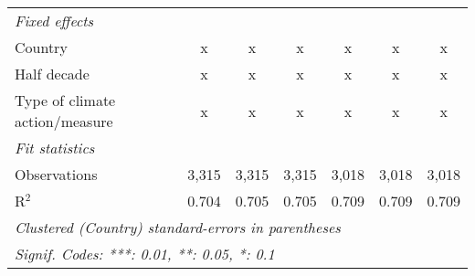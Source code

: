 \begin{tabular}{lcccccc}
   \emph{Fixed effects}\\
   Country                                                          & x       & x             & x             & x             & x             & x\\  
   Half decade                                                      & x       & x             & x             & x             & x             & x\\  
   Type of climate action/measure                                   & x       & x             & x             & x             & x             & x\\  
   \midrule \emph{Fit statistics}\\
   Observations                                                     & 3,315   & 3,315         & 3,315         & 3,018         & 3,018         & 3,018\\  
   R$^2$                                                            & 0.704   & 0.705         & 0.705         & 0.709         & 0.709         & 0.709\\  
   \midrule
   \multicolumn{7}{l}{\emph{Clustered (Country) standard-errors in parentheses}}\\
   \multicolumn{7}{l}{\emph{Signif. Codes: ***: 0.01, **: 0.05, *: 0.1}}\\
\end{tabular}
\par\endgroup


